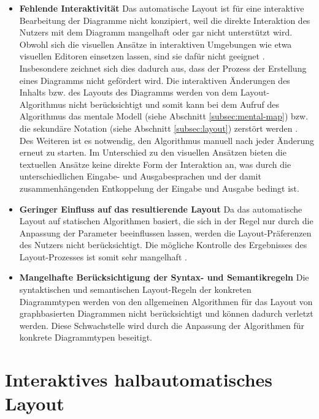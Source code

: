 \begin{itemize}

\item
\textbf{Fehlende Interaktivität}
Das automatische Layout ist für eine interaktive Bearbeitung der Diagramme nicht konzipiert, weil die direkte Interaktion des Nutzers mit dem Diagramm mangelhaft oder gar nicht unterstützt wird. Obwohl sich die visuellen Ansätze in interaktiven Umgebungen wie etwa visuellen Editoren einsetzen lassen, sind sie dafür nicht geeignet \cite[S.22ff]{Maier12A-Pattern-based} \cite[S.4]{DwyerMarriott08Interactive}. Insbesondere zeichnet sich dies dadurch aus, dass der Prozess der Erstellung eines Diagramms nicht gefördert wird. Die interaktiven Änderungen des Inhalts bzw. des Layouts des Diagramms werden von dem Layout-Algorithmus nicht berücksichtigt und somit kann bei dem Aufruf des Algorithmus das mentale Modell (siehe Abschnitt \ref{subsec:mental-map}) bzw. die sekundäre Notation (siehe Abschnitt \ref{subsec:layout}) zerstört werden \cite{Eiglsperger04Automatic}. Des Weiteren ist es notwendig, den Algorithmus manuell nach jeder Änderung erneut zu starten. Im Unterschied zu den visuellen Ansätzen bieten die textuellen Ansätze keine direkte Form der Interaktion an, was durch die unterschiedlichen Eingabe- und Ausgabesprachen und der damit zusammenhängenden Entkoppelung der Eingabe und Ausgabe bedingt ist.

\item
\textbf{Geringer Einfluss auf das resultierende Layout}
Da das automatische Layout auf statischen Algorithmen basiert, die sich in der Regel nur durch die Anpassung der Parameter beeinflussen lassen, werden die Layout-Präferenzen des Nutzers nicht berücksichtigt. Die mögliche Kontrolle des Ergebnisses des Layout-Prozesses ist somit sehr mangelhaft \cite{GladischSchumann14Semi-Automatic}.

\item
\textbf{Mangelhafte Berücksichtigung der Syntax- und Semantikregeln}
Die syntaktischen und semantischen Layout-Regeln der konkreten Diagrammtypen werden von den allgemeinen Algorithmen für das Layout von graphbasierten Diagrammen nicht berücksichtigt und können dadurch verletzt werden. Diese Schwachstelle wird durch die Anpassung der Algorithmen für konkrete Diagrammtypen beseitigt.

\end{itemize}

\section{Interaktives halbautomatisches Layout}
\label{sec:interactive-semi-automatic-layout}


